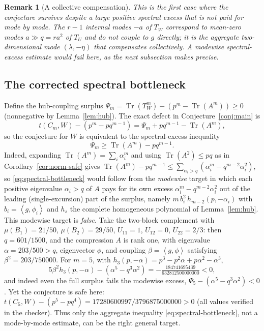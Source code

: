 \documentclass[11pt]{article}
\newtheorem{remark}[theorem]{Remark}
\newcommand{\ip}[2]{\left\langle #1,#2\right\rangle}
\newcommand{\Tr}{\operatorname{Tr}}
\begin{document}
\begin{remark}[A collective compensation]
This is the first case where the conjecture survives despite a large positive spectral excess that is \emph{not} paid for mode by mode.  The $r-1$ internal modes $-a$ of $T_W$ correspond to mean-zero modes $a\gg q=ra^2$ of $T_U$ and do not couple to $g$ directly; it is the aggregate two-dimensional mode $(\lambda,-\eta)$ that compensates collectively.  A modewise spectral-excess estimate would fail here, as the next subsection makes precise.
\end{remark}

\subsection{The corrected spectral bottleneck}\label{subsec:bottleneck}

Define the hub-coupling surplus $\Psi_m=\Tr(T_W^m)-(p^m-\Tr(A^m))\ge0$ (nonnegative by Lemma~\ref{lem:hub}).  The exact defect in Conjecture~\ref{conj:main} is
\[
        t(C_m,W)-(p^m-pq^{m-1})=\Psi_m+pq^{m-1}-\Tr(A^m),
\]
so the conjecture for $W$ is equivalent to the spectral-excess inequality
\begin{equation}\label{eq:spectral-bottleneck}
        \Psi_m\ge\Tr(A^m)-pq^{m-1}.
\end{equation}
Indeed, expanding $\Tr(A^m)=\sum_i\alpha_i^m$ and using $\Tr(A^2)\le pq$ as in Corollary~\ref{cor:norm-safe} gives $\Tr(A^m)-pq^{m-1}\le\sum_{\alpha_i>q}(\alpha_i^m-q^{m-2}\alpha_i^2)$, so \eqref{eq:spectral-bottleneck} would follow from the \emph{modewise} target in which each positive eigenvalue $\alpha_i>q$ of $A$ pays for its own excess $\alpha_i^m-q^{m-2}\alpha_i^2$ out of the leading (single-excursion) part of the surplus, namely $m\,b_i^2\,h_{m-2}(p,-\alpha_i)$ with $b_i=\ip{g}{\phi_i}$ and $h_s$ the complete homogeneous polynomial of Lemma~\ref{lem:hub}.  This modewise target is \emph{false}.  Take the two-block complement with $\mu(B_1)=21/50$, $\mu(B_2)=29/50$, $U_{11}=1$, $U_{12}=0$, $U_{22}=2/3$: then $q=601/1500$, and the compression $A$ is rank one, with eigenvalue $\alpha=203/500>q$, eigenvector $\phi$, and coupling $\beta=\ip{g}{\phi}$ satisfying $\beta^2=203/750000$.  For $m=5$, with $h_3(p,-\alpha)=p^3-p^2\alpha+p\alpha^2-\alpha^3$,
\[
        5\beta^2h_3(p,-\alpha)-(\alpha^5-q^3\alpha^2)=-\tfrac{184741695439}{632812500000000}<0,
\]
and indeed even the full surplus fails the modewise excess, $\Psi_5-(\alpha^5-q^3\alpha^2)<0$.  Yet the conjecture is safe here: $t(C_5,W)-(p^5-pq^4)=17280600997/3796875000000>0$ (all values verified in the checker).  Thus only the aggregate inequality \eqref{eq:spectral-bottleneck}, not a mode-by-mode estimate, can be the right general target.
\end{document}
